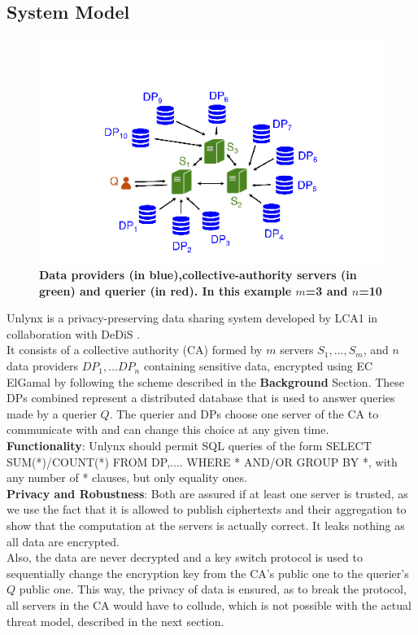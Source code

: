 \documentclass{article}
\begin{document}
\subsection{System Model}
\begin{figure}[H]
\centering
\includegraphics[scale=0.65]{img/UnlynxFunc.png}
\caption{\textbf{Data providers (in blue),collective-authority servers (in green) and querier (in red). In this example $m$=3 and $n$=10}}
\end{figure}
Unlynx is a privacy-preserving data sharing system developed by LCA1 \cite{lca} in collaboration with DeDiS \cite{dedis}.\\
It consists of a collective authority (CA) formed by $m$ servers $S_1,...,S_m$, and $n$ data providers $DP_1,...DP_n$ containing sensitive data, encrypted using EC ElGamal by following the scheme described in the \textbf{Background} Section. These DPs combined represent a distributed database that is used to answer queries made by a querier $Q$. The querier and DPs choose one server of the CA to communicate with and can change this choice at any given time.\\
\textbf{Functionality}: Unlynx should permit SQL queries of the form SELECT SUM(*)/COUNT(*) FROM DP,.... WHERE * AND/OR GROUP BY *, with any number of * clauses, but only equality ones.\\
\textbf{Privacy and Robustness}: Both are assured if at least one server is trusted, as we use the fact that it is allowed to publish ciphertexts and their aggregation to show that the computation at the servers is actually correct. It leaks nothing as all data are encrypted.\\
Also, the data are never decrypted and a key switch protocol is used to sequentially change the encryption key from the CA's public one to the querier's $Q$ public one. This way, the privacy of data is ensured, as to break the protocol, all servers in the CA would have to collude, which is not possible with the actual threat model, described in the next section.
\end{document}
